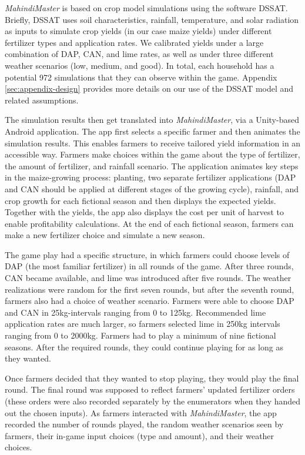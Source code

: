 \documentclass[12pt,letterpaper]{article}
\begin{document}
\textit{MahindiMaster} is based on crop model simulations using the software DSSAT. Briefly, DSSAT uses soil characteristics, rainfall, temperature, and solar radiation as inputs to simulate crop yields (in our case maize yields) under different fertilizer types and application rates. We calibrated yields under a large combination of DAP, CAN, and lime rates, as well as under three different weather scenarios (low, medium, and good). In total, each household has a potential 972 simulations that they can observe within the game. Appendix \ref{sec:appendix-design} provides more details on our use of the DSSAT model and related assumptions.

The simulation results then get translated into \textit{MahindiMaster}, via a Unity-based Android application. The app first selects a specific farmer and then animates the simulation results. This enables farmers to receive tailored yield information in an accessible way. Farmers make choices within the game about the type of fertilizer, the amount of fertilizer, and rainfall scenario. The application animates key steps in the maize-growing process: planting, two separate fertilizer applications (DAP and CAN should be applied at different stages of the growing cycle), rainfall, and crop growth for each fictional season and then displays the expected yields. Together with the yields, the app also displays the cost per unit of harvest to enable profitability calculations. At the end of each fictional season, farmers can make a new fertilizer choice and simulate a new season. 

The game play had a specific structure, in which farmers could choose levels of DAP (the most familiar fertilizer) in all rounds of the game. After three rounds, CAN became available, and lime was introduced after five rounds. The weather realizations were random for the first seven rounds, but after the seventh round, farmers also had a choice of weather scenario. Farmers were able to choose DAP and CAN in 25kg-intervals ranging from 0 to 125kg. Recommended lime application rates are much larger, so farmers selected lime in 250kg intervals ranging from 0 to 2000kg. Farmers had to play a minimum of nine fictional seasons. After the required rounds, they could continue playing for as long as they wanted. 

Once farmers decided that they wanted to stop playing, they would play the final round. The final round was supposed to reflect farmers' updated fertilizer orders (these orders were also recorded separately by the enumerators when they handed out the chosen inputs). As farmers interacted with \textit{MahindiMaster}, the app recorded the number of rounds played, the random weather scenarios seen by farmers, their in-game input choices (type and amount), and their weather choices.
\end{document}
